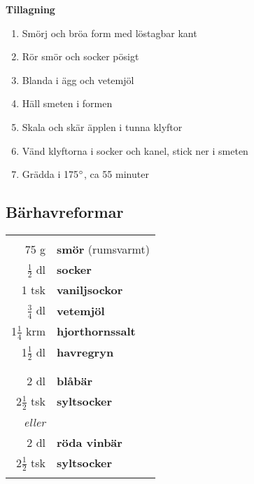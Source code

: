 \begin{multicols*}{2}

\noindent \textbf{Tillagning}
\begin{enumerate}
	\itemsep0cm
	\item Smörj och bröa form med löstagbar kant
	\item Rör smör och socker pösigt
	\item Blanda i ägg och vetemjöl
	\item Häll smeten i formen
	\item Skala och skär äpplen i tunna klyftor
	\item Vänd klyftorna i socker och \mbox{kanel}, stick ner i smeten
	\item Grädda i 175$\degree$, ca 55 minuter
\end{enumerate}

\end{multicols*}

\clearpage

\subsection{Bärhavreformar}

\begin{table}[H]
	\begin{tabular}{rl}
	\hline
	&\\
		75 g & \textbf{smör} (rumsvarmt)\\
		$\frac{1}{2}$ dl & \textbf{socker}\\
		1 tsk & \textbf{vaniljsockor}\\
		$\frac{3}{4}$ dl & \textbf{vetemjöl}\\
		1$\frac{1}{4}$ krm & \textbf{hjorthornssalt}\\
		1$\frac{1}{2}$ dl & \textbf{havregryn}\\
		& \\
		\hline
		& \\
		2 dl & \textbf{blåbär}\\
		2$\frac{1}{2}$ tsk & \textbf{syltsocker}\\
		\textit{eller}& \\
		2 dl & \textbf{röda vinbär}\\
		2$\frac{1}{2}$ tsk & \textbf{syltsocker}\\
	&\\
	\hline
	\end{tabular}
\end{table}

